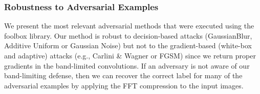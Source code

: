 


\subsubsection{Robustness to Adversarial Examples}
We present the most relevant adversarial methods that were executed using the foolbox library. Our method is robust to decision-based attacks (GaussianBlur, Additive Uniform or Gaussian Noise) but not to the gradient-based (white-box and adaptive) attacks (e.g., Carlini \& Wagner or FGSM) since we return proper gradients in the band-limited convolutions. If an adversary is not aware of our band-limiting defense, then we can recover the correct label for many of the adversarial examples by applying the FFT compression to the input images.


